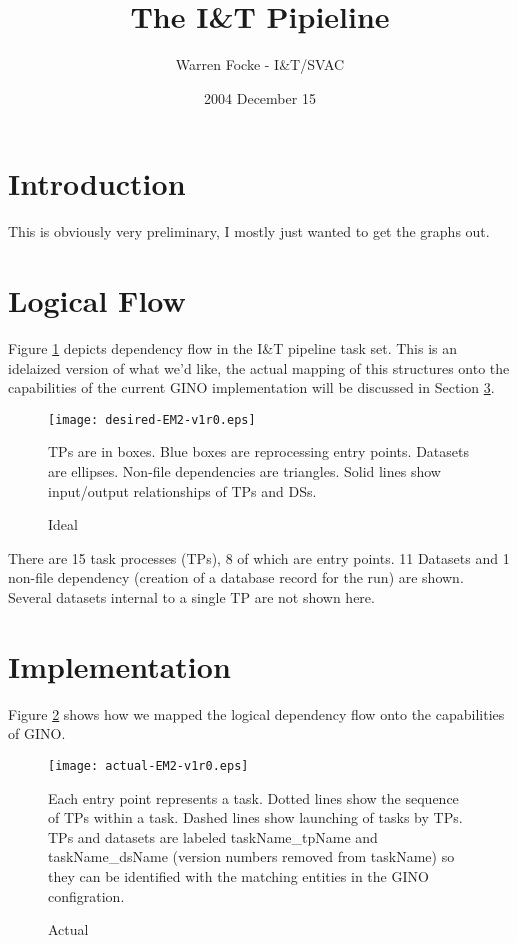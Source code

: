 \documentclass{article}
\begin{document}
\title{The I\&T Pipieline}
\author{Warren Focke - I\&T/SVAC}
\date{2004 December 15}
\maketitle


\section{Introduction}
\label{intro-sec}

This is obviously very preliminary, I mostly just wanted to get the graphs
out.


\section{Logical Flow}
\label{logic-sec}

Figure \ref{desired-fig} depicts dependency flow in the I\&T pipeline task set.
This is an idelaized version of what we'd like, the actual mapping of this
structures onto the capabilities of the current GINO implementation will be
discussed in Section \ref{implement-sec}.

\begin{figure}
\label{desired-fig}
\caption{Ideal}
\texttt{[image: desired-EM2-v1r0.eps]}

{TPs are in boxes. Blue boxes are reprocessing entry points.  Datasets are
ellipses. Non-file dependencies are triangles.  Solid lines show input/output
relationships of TPs and DSs.}

\end{figure}

There are 15 task processes (TPs), 8 of which are entry points.  11 Datasets
and 1 non-file dependency (creation of a database record for the run) are
shown.  Several datasets internal to a single TP are not shown here.




\section{Implementation}
\label{implement-sec}

Figure \ref{actual-fig} shows how we mapped the logical dependency flow onto
the capabilities of GINO.

\begin{figure}
\label{actual-fig}
\caption{Actual}
\texttt{[image: actual-EM2-v1r0.eps]}

{Each entry point represents a task.  Dotted lines show the sequence of TPs
within a task.  Dashed lines show launching of tasks by TPs.  TPs and datasets
are labeled taskName\_tpName and taskName\_dsName (version numbers removed
from taskName) so they can be identified with the matching entities in the
GINO configration.}

\end{figure}
\end{document}
